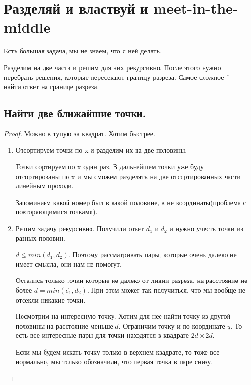 \chapter{Разделяй и властвуй и meet-in-the-middle}

Есть большая задача, мы не знаем, что с ней делать.

Разделим на две части и решим для них рекурсивно. После этого 
нужно перебрать решения, которые пересекают границу разреза. Самое 
сложное “--- найти ответ на границе разреза. 

\section{Найти две ближайшие точки.} 
    \begin{proof}
        Можно в тупую за квадрат. Хотим быстрее. 
        \begin{enumerate}
        \item
        Отсортируем точки по x и разделим их на две половины. 
        
        Точки сортируем по x один раз. В дальнейшем точки уже будут отсортированы по x и
        мы сможем разделять на две отсортированных части линейным проходи. 
        
        Запоминаем какой номер был в какой половине, в не координаты(проблема с повторяющимися точками).
        \item
        Решим задачу рекурсивно. Получили ответ $d_1$ и $d_2$ и нужно учесть 
        точки из разных половин. 

       $d \le min(d_1, d_2)$. Поэтому рассматривать пары, которые очень далеко не имеет смысла, они нам не помогут. 

       Остались только точки которые не далеко от линии разреза, на расстояние не более $d = min(d_1, d_2)$. При этом 
       может так получиться, что мы вообще не отсекли никакие точки. 

       Посмотрим на интересную точку. Хотим для нее найти точку из другой половины на расстояние меньше $d$. Ограничим точку и 
       по координате $y$. То есть все интересные пары для точки находятся в квадрате $2d \times 2d$.

       Если мы будем искать точку только в верхнем квадрате, то тоже все нормально, мы только обозначили, что первая точка в паре снизу.


\end{enumerate}
\end{proof}
